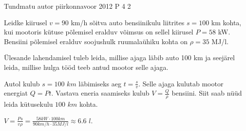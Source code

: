 {Tundmatu autor} %
{piirkonnavoor} %
{2012} %
{P 4} %
{2} %
{

\ifStatement
Leidke kiirusel $v = 90$ km/h sõitva auto bensiinikulu liitrites $s = 100$ km kohta, kui mootoris kütuse põlemisel eralduv  võimsus on sellel kiirusel $P = 58$ kW. Bensiini põlemisel eralduv soojushulk ruumalaühiku kohta on $\rho = 35$ MJ/l.
\fi

\ifHint
Ülesande lahendamisel tuleb leida, millise ajaga läbib auto 100 km ja seejärel leida, millise hulga tööd teeb antud mootor selle ajaga.
\fi

\ifSolution
Autol kulub $s = 100$ $km$ läbimiseks aeg $t = \frac{s}{v}$. Selle ajaga kulutab mootor energiat $Q = Pt$. Vastava eneria saamiseks kulub $V = \frac{Q}{\rho}$ bensiini. Siit saab nüüd leida kütusekulu $100$ $km$ kohta.
\begin{center}
$V = \frac{Ps}{v \rho} = \frac{58 kW \cdot 100 km}{90 km/h \cdot 35 MJ/l} \approx 6.6$ $l$.
\end{center}
\fi
}